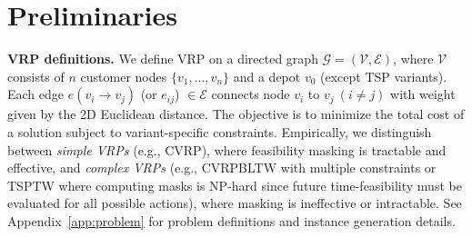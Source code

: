 \documentclass{article} %
\begin{document}
\section{Preliminaries}

\textbf{VRP definitions.} We define VRP on a directed graph $\mathcal{G} = (\mathcal{V}, \mathcal{E})$, where $\mathcal{V}$ consists of $n$ customer nodes $\{v_1, \dots, v_n\}$ and a depot $v_0$ (except TSP variants). Each edge $e(v_i \rightarrow v_j)$ (or $e_{ij}$) $\in \mathcal{E}$ connects node $v_i$ to $v_j~(i \neq j)$ with weight given by the 2D Euclidean distance. The objective is to minimize the total cost of a solution subject to variant-specific constraints. Empirically, we distinguish between \emph{simple VRPs} (e.g., CVRP), where feasibility masking is tractable and effective, and \emph{complex VRPs} (e.g., CVRPBLTW with multiple constraints or TSPTW where computing masks is NP-hard since future time-feasibility must be evaluated for all possible actions), where masking is ineffective or intractable. See Appendix~\ref{app:problem} for problem definitions and instance generation details.
\end{document}
